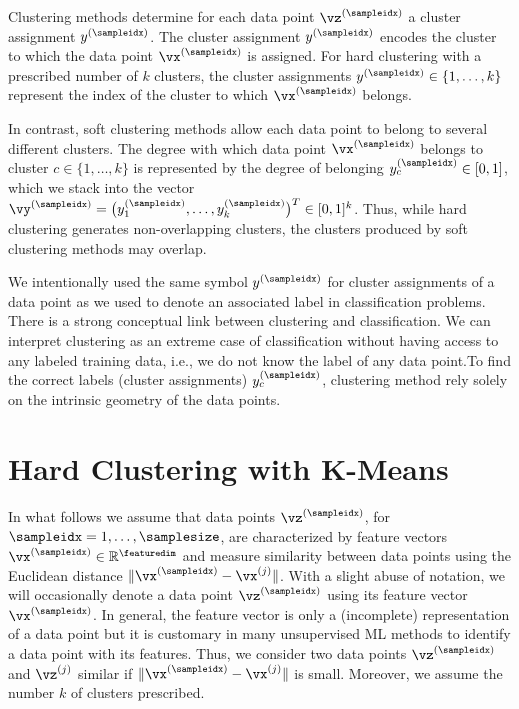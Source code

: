 \documentclass[12pt]{report}
\begin{document}
Clustering methods determine for each data point $\vz^{(\sampleidx)}$ 
a cluster assignment $y^{(\sampleidx)}$. The cluster assignment $y^{(\sampleidx)}$ 
encodes the cluster to which the data point $\vx^{(\sampleidx)}$ is assigned. 
For hard clustering with a prescribed number of $k$ clusters, the cluster assignments $y^{(\sampleidx)} \in \{1,\ldots,k\}$ 
represent the index of the cluster to which $\vx^{(\sampleidx)}$ belongs. 

In contrast, soft clustering methods allow each data point to belong to 
several different clusters. The degree with which data point $\vx^{(\sampleidx)}$ 
belongs to cluster $c \in \{1,\ldots,k\}$ is represented by the degree of 
belonging $y_{c}^{(\sampleidx)} \in [0,1]$, which we stack into the vector 
$\vy^{(\sampleidx)} = \big(y_{1}^{(\sampleidx)},\ldots,y_{k}^{(\sampleidx)}\big)^{T} \in [0,1]^{k}$. 
Thus, while hard clustering generates non-overlapping clusters, the 
clusters produced by soft clustering methods may overlap. 

We intentionally used the same symbol $y^{(\sampleidx)}$ for 
cluster assignments of a data point as we used to denote an 
associated label in classification problems. There is a strong 
conceptual link between clustering and classification. We can 
interpret clustering as an extreme case of classification without 
having access to any labeled training data, i.e., we do not 
know the label of any data point.To find the correct labels 
(cluster assignments) $y_{c}^{(\sampleidx)}$, clustering method 
rely solely on the intrinsic geometry of the data points. 

\newpage
\section{Hard Clustering with K-Means}
\label{sec_hard_clustering}

In what follows we assume that data points $\vz^{(\sampleidx)}$, for $\sampleidx=1,\ldots,\samplesize$, 
are characterized by feature vectors $\vx^{(\sampleidx)} \in \mathbb{R}^{\featuredim}$ and measure 
similarity between data points using the Euclidean distance $\| \vx^{(\sampleidx)} - \vx^{(j)} \|$. 
With a slight abuse of notation, we will occasionally denote a data point $\vz^{(\sampleidx)}$ 
using its feature vector $\vx^{(\sampleidx)}$. In general, the feature vector 
is only a (incomplete) representation of a data point but it is customary in 
many unsupervised ML methods to identify a data point with its features.
Thus, we consider two data points $\vz^{(\sampleidx)}$ and $\vz^{(j)}$ 
similar if $\| \vx^{(\sampleidx)} - \vx^{(j)} \|$ is small. Moreover, we assume 
the number $k$ of clusters prescribed. 
\end{document}
